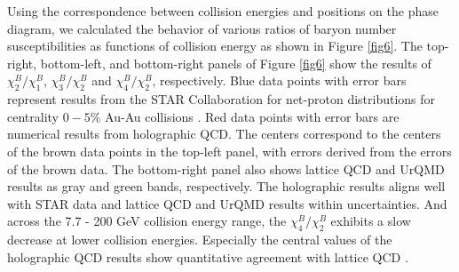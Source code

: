 \documentclass[a4paper,12pt]{article}
\numberwithin{equation}{section}
\begin{document}
Using the correspondence between collision energies and positions on the phase diagram, we calculated the behavior of various ratios of baryon number susceptibilities as functions of collision energy as shown in Figure \ref{fig6}. The top-right, bottom-left, and bottom-right panels of Figure \ref{fig6} show the results of $\chi_2^B/\chi_1^B$, $\chi_3^B/\chi_2^B$ and $\chi_4^B/\chi_2^B$, respectively. Blue data points with error bars represent results from the STAR Collaboration for net-proton distributions for centrality $0 - 5\%$ Au-Au collisions \cite{Xu:2016mqs,STAR:2021fge,STAR:2025zdq}. Red data points with error bars are numerical results from holographic QCD. The centers correspond to the centers of the brown data points in the top-left panel, with errors derived from the errors of the brown data. The bottom-right panel also shows lattice QCD \cite{Bazavov:2020bjn,Bollweg:2024epj} and UrQMD results \cite{Bass:1998ca,Bleicher:1999xi} as gray and green bands, respectively. The holographic results aligns well with STAR data and lattice QCD and UrQMD results within uncertainties. And across the 7.7 - 200 GeV collision energy range, the $\chi_4^B/\chi_2^B$ exhibits a slow decrease at lower collision energies. Especially the central values of the holographic QCD results show quantitative agreement with lattice QCD \cite{Bazavov:2020bjn,Bollweg:2024epj}.
\end{document}
